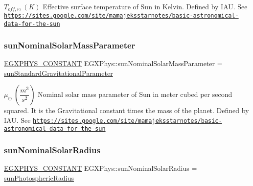 $ T_{eff,\odot} \ (K)$ Effective surface temperature of Sun in Kelvin. Defined by I\+AU. See \href{https://sites.google.com/site/mamajeksstarnotes/basic-astronomical-data-for-the-sun}{\tt https\+://sites.\+google.\+com/site/mamajeksstarnotes/basic-\/astronomical-\/data-\/for-\/the-\/sun} \mbox{\label{group___e_g_x_phys-_constants-_astrophysics-_solar_system-_sun-_bulk_gaadeeeb0634200ad2ad89a5b8b721dd8d}} 
\subsubsection{\texorpdfstring{sun\+Nominal\+Solar\+Mass\+Parameter}{sunNominalSolarMassParameter}}
{\footnotesize\ttfamily \mbox{\hyperlink{group___e_g_x_phys-_constants-_macros_ga76980d288494ce1714c9ac68a95ba702}{E\+G\+X\+P\+H\+Y\+S\+\_\+\+C\+O\+N\+S\+T\+A\+NT}} E\+G\+X\+Phys\+::sun\+Nominal\+Solar\+Mass\+Parameter = \mbox{\hyperlink{group___e_g_x_phys-_constants-_astrophysics-_solar_system-_sun-_bulk_ga17d411dceb8d2ff98b8a270eaa72117d}{sun\+Standard\+Gravitational\+Parameter}}}

$ \mu_{\odot} \ (\dfrac{m^3}{s^2})$ Nominal solar mass parameter of Sun in meter cubed per second squared. It is the Gravitational constant times the mass of the planet. Defined by I\+AU. See \href{https://sites.google.com/site/mamajeksstarnotes/basic-astronomical-data-for-the-sun}{\tt https\+://sites.\+google.\+com/site/mamajeksstarnotes/basic-\/astronomical-\/data-\/for-\/the-\/sun} \mbox{\label{group___e_g_x_phys-_constants-_astrophysics-_solar_system-_sun-_bulk_ga5bebe7d507ffd0372e8e1a20e3662d5d}} 
\subsubsection{\texorpdfstring{sun\+Nominal\+Solar\+Radius}{sunNominalSolarRadius}}
{\footnotesize\ttfamily \mbox{\hyperlink{group___e_g_x_phys-_constants-_macros_ga76980d288494ce1714c9ac68a95ba702}{E\+G\+X\+P\+H\+Y\+S\+\_\+\+C\+O\+N\+S\+T\+A\+NT}} E\+G\+X\+Phys\+::sun\+Nominal\+Solar\+Radius = \mbox{\hyperlink{group___e_g_x_phys-_constants-_astrophysics-_solar_system-_sun-_bulk_gac257be308fa17adaf47f3310c5c65377}{sun\+Photospheric\+Radius}}}

